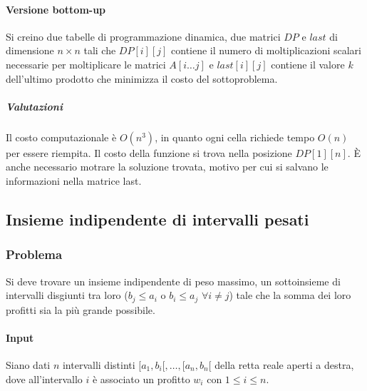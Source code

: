 \paragraph{Versione bottom-up}
Si creino due tabelle di programmazione dinamica, due matrici $DP$ e $last$ di dimensione $n\times n$ tali che $DP[i][j]$ contiene il numero di moltiplicazioni scalari necessarie per 
moltiplicare le matrici $A[i\dots j]$ e $last[i][j]$ contiene il valore $k$ dell'ultimo prodotto che minimizza il costo del sottoproblema.\\

\subparagraph{Valutazioni}
Il costo computazionale \`e $O(n^3)$, in quanto ogni cella richiede tempo $O(n)$ per essere riempita. Il costo della funzione si trova nella posizione $DP[1][n]$. \`E anche necessario
motrare la soluzione trovata, motivo per cui si salvano le informazioni nella matrice last.\\ 



\subsection{Insieme indipendente di intervalli pesati}
\subsubsection{Problema}
Si deve trovare un insieme indipendente di peso massimo, un sottoinsieme di intervalli disgiunti tra loro ($b_j \le a_i$ o $b_i\le a_j$ $\forall i\neq j$) tale che la somma dei loro 
profitti sia la pi\`u grande possibile.
\paragraph{Input}
Siano dati $n$ intervalli distinti $[a_1, b_i[, \dots, [a_n, b_n[$ della retta reale aperti a destra, dove all'intervallo $i$ \`e associato un profitto $w_i$ con $1\le i\le n$.

